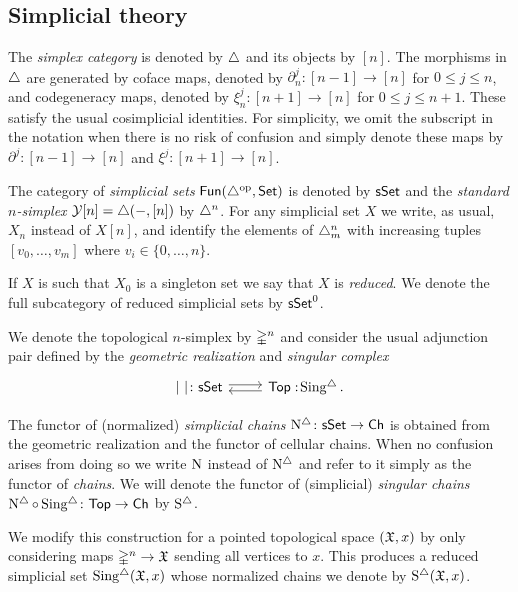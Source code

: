 \subsection{Simplicial theory}\label{ss:simplicial}

The \textit{simplex category} is denoted by $\triangle$ and its objects by $[n]$. The morphisms in $\triangle$ are generated by coface maps, denoted by $\partial^{j}_n \colon [n-1] \to [n]$ for $0\leq j \leq n$, and codegeneracy maps, denoted by $\xi^{j}_n \colon [n+1] \to [n]$ for $0 \leq j \leq n+1$. These satisfy the usual cosimplicial identities. For simplicity, we omit the subscript in the notation when there is no risk of confusion and simply denote these maps by $\partial^{j} \colon [n-1] \to [n]$ and $\xi^{j} \colon [n+1] \to [n]$.


The category of \textit{simplicial sets} $\mathsf{Fun}(\triangle^{\mathrm{op}}, \mathsf{Set})$ is denoted by $\mathsf{sSet}$ and the \textit{standard $n$-simplex} $\operatorname{\mathcal{Y}} [n] = \triangle(-, [n])$ by $\triangle^n$.
For any simplicial set $X$ we write, as usual, $X_n$ instead of $X[n]$, and identify the elements of $\triangle^n_m$ with increasing tuples $[v_0, \dots, v_m]$ where $v_i \in \{0, \dots, n\}$.

If $X$ is such that $X_0$ is a singleton set we say that $X$ is \textit{reduced}.
We denote the full subcategory of reduced simplicial sets by $\mathsf{sSet}^0$.

We denote the topological $n$-simplex by $\mathbb{\Delta}^{n}$ and consider the usual adjunction pair defined by the \textit{geometric realization} and \textit{singular complex}
\[
\begin{tikzcd}
	\bars{\ } \colon \sSet \arrow[r, shift left=.5ex] &
	\Top :\! \sSing. \arrow[l, shift left=.5ex]
\end{tikzcd}
\]

The functor of (normalized) \textit{simplicial chains} $\operatorname{N^{\triangle}} \colon \mathsf{sSet} \to \mathsf{Ch}$ is obtained from the geometric realization and the functor of cellular chains.
When no confusion arises from doing so we write $\operatorname{N}$ instead of $\operatorname{N^{\triangle}}$ and refer to it simply as the functor of \textit{chains}.
We will denote the functor of (simplicial) \textit{singular chains} $\operatorname{N^{\triangle}} \circ \operatorname{Sing^{\triangle}} \colon \mathsf{Top} \to \mathsf{Ch}$ by $\operatorname{S^{\triangle}}$.

We modify this construction for a pointed topological space $(\mathfrak{X},x)$ by only considering maps $\mathbb{\Delta}^n \to \mathfrak{X}$ sending all vertices to $x$.
This produces a reduced simplicial set $\operatorname{Sing^{\triangle}}(\mathfrak{X},x)$ whose normalized chains we denote by $\operatorname{S^{\triangle}}(\mathfrak{X},x)$.

